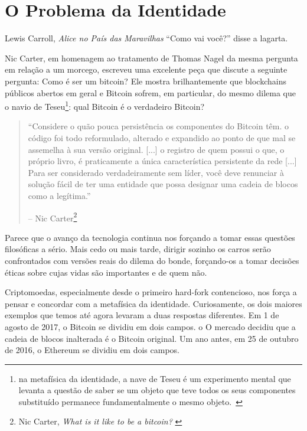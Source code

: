 \chapter{O Problema da Identidade}
\label{les:4}

\begin{chapquote}{Lewis Carroll, \textit{Alice no País das Maravilhas}}
  \enquote{Como vai você?} disse a lagarta.
\end{chapquote}

Nic Carter, em homenagem ao tratamento de Thomas Nagel da mesma
pergunta em relação a um morcego, escreveu uma excelente peça que discute
a seguinte pergunta: Como é ser um bitcoin? Ele
mostra brilhantemente que blockchains públicos abertos em geral e Bitcoin
sofrem, em particular, do mesmo dilema que o navio de Teseu\footnote{na
metafísica da identidade, a nave de Teseu é um experimento mental que
levanta a questão de saber se um objeto que teve todos os seus componentes
substituído permanece fundamentalmente o mesmo objeto.~\cite{wiki:theseus}}: qual
Bitcoin é o verdadeiro Bitcoin?

\begin{quotation}\begin{samepage}
\enquote{Considere o quão pouca persistência os componentes do Bitcoin têm. o
código foi todo reformulado, alterado e expandido ao ponto de que
mal se assemelha à sua versão original. [...] o registro de quem
possui o que, o próprio livro, é praticamente a única característica persistente
da rede [...]
Para ser considerado verdadeiramente sem líder, você deve renunciar à 
solução fácil de ter uma entidade que possa designar uma cadeia de blocos como a
legítima.}
\begin{flushright} -- Nic Carter\footnote{Nic Carter, \textit{What is it like to be a bitcoin?} \cite{bitcoin-identity}}
\end{flushright}\end{samepage}\end{quotation}

Parece que o avanço da tecnologia continua nos forçando a tomar
essas questões filosóficas a sério. Mais cedo ou mais tarde, dirigir sozinho
os carros serão confrontados com versões reais do dilema do bonde,
forçando-os a tomar decisões éticas sobre cujas vidas são importantes e
de quem não.

Criptomoedas, especialmente desde o primeiro hard-fork contencioso,
nos força a pensar e concordar com a metafísica da identidade.
Curiosamente, os dois maiores exemplos que temos até agora levaram a duas
respostas diferentes. Em 1 de agosto de 2017, o Bitcoin se dividiu em dois campos. o
O mercado decidiu que a cadeia de blocos inalterada é o Bitcoin original. Um ano
antes, em 25 de outubro de 2016, o Ethereum se dividiu em dois campos.

